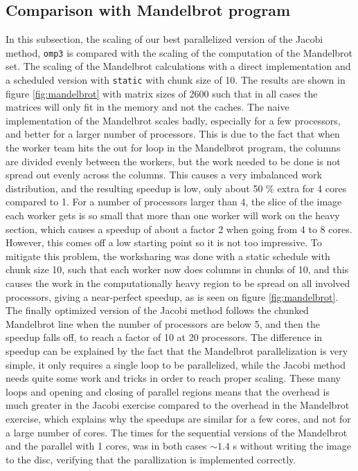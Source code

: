 \subsection{Comparison with Mandelbrot program}
In this subsection, the scaling of our best parallelized version of the Jacobi method, \texttt{omp3} is compared with the scaling of the computation of the Mandelbrot set. The scaling of the Mandelbrot calculations with a direct implementation and a scheduled version with \texttt{static} with chunk size of 10. The results are shown in figure \ref{fig:mandelbrot} with matrix sizes of 2600 such that in all cases the matrices will only fit in the memory and not the caches. The naive implementation of the Mandelbrot scales badly, especially for a few processors, and better for a larger number of processors. This is due to the fact that when the worker team hits the out for loop in the Mandelbrot program, the columns are divided evenly between the workers, but the work needed to be done is not spread out evenly across the columns. This causes a very imbalanced work distribution, and the resulting speedup is low, only about 50 \% extra for 4 cores compared to 1. For a number of processors larger than 4, the slice of the image each worker gets is so small that more than one worker will work on the heavy section, which causes a speedup of about a factor 2 when going from 4 to 8 cores. However, this comes off a low starting point so it is not too impressive. To mitigate this problem, the worksharing was done with a static schedule with chunk size 10, such that each worker now does columns in chunks of 10, and this causes the work in the computationally heavy region to be spread on all involved processors, giving a near-perfect speedup, as is seen on figure \ref{fig:mandelbrot}. The finally optimized version of the Jacobi method follows the chunked Mandelbrot line when the number of processors are below 5, and then the speedup falls off, to reach a factor of 10 at 20 processors. The difference in speedup can be explained by the fact that the Mandelbrot parallelization is very simple, it only requires a single loop to be parallelized, while the Jacobi method needs quite some work and tricks in order to reach proper scaling. These many loops and opening and closing of parallel regions means that the overhead is much greater in the Jacobi exercise compared to the overhead in the Mandelbrot exercise, which explains why the speedups are similar for a few cores, and not for a large number of cores. The times for the sequential versions of the Mandelbrot and the parallel with 1 cores, was in both cases $\sim 1.4$ s without writing the image to the disc, verifying that the parallization is implemented correctly.

